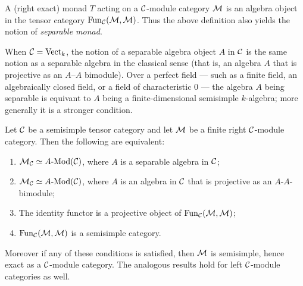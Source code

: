 \documentclass{amsart}
\begin{document}
\begin{remark}
	A (right exact) monad $T$ acting on a $\mathcal C$-module category $\mathcal M$ is an algebra object in the tensor category $\operatorname{Fun}_\mathcal C(\mathcal M, \mathcal M)$. Thus the above definition also yields the notion of {\em separable monad}. 
\end{remark}

\begin{remark}
	When $\mathcal C = \mathrm{Vect}_k$, the notion of a separable algebra object $A$ in $\mathcal C$ is the same notion as a separable algebra in the classical sense (that is, an algebra $A$ that is projective as an $A$--$A$ bimodule). Over a perfect field --- such as a finite field, an algebraically closed field, or a field of characteristic $0$ --- the algebra $A$ being separable is equivant to $A$ being a finite-dimensional semisimple $k$-algebra; more generally it is a stronger condition. 
\end{remark}

\begin{theorem} \label{thm:SepModCats}
	Let $\mathcal C$ be a  semisimple tensor category and let $\mathcal M$ be a finite right $\mathcal C$-module category. Then the following are equivalent:
	\begin{enumerate}
		\item $\cM_\cC \simeq \Mod{A}{}(\cC)$, where $A$ is a separable algebra in $\mathcal C$;
		\item $\cM_\cC \simeq \Mod{A}{}(\cC)$, where $A$ is an algebra in $\mathcal C$ that is projective as an $A$-$A$-bimodule;
		\item The identity functor is a projective object of $\operatorname{Fun}_\mathcal C(\mathcal M, \mathcal M)$;
		\item $\operatorname{Fun}_\mathcal C(\mathcal M, \mathcal M)$ is a semisimple category. 
	\end{enumerate}
	Moreover if any of these conditions is satisfied, then $\mathcal M$ is semisimple, hence exact as a $\mathcal C$-module category. The analogous results hold for left $\mathcal C$-module categories as well. 
\end{theorem}
\end{document}
